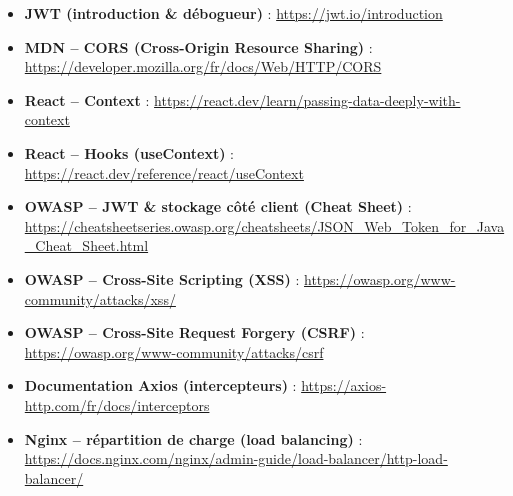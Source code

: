 \begin{itemize}
	\item \textbf{JWT (introduction \& débogueur)} : \url{https://jwt.io/introduction}
	\item \textbf{MDN -- CORS (Cross-Origin Resource Sharing)} : \url{https://developer.mozilla.org/fr/docs/Web/HTTP/CORS}
	\item \textbf{React -- Context} : \url{https://react.dev/learn/passing-data-deeply-with-context}
	\item \textbf{React -- Hooks (useContext)} : \url{https://react.dev/reference/react/useContext}
	\item \textbf{OWASP -- JWT \& stockage côté client (Cheat Sheet)} : \url{https://cheatsheetseries.owasp.org/cheatsheets/JSON_Web_Token_for_Java_Cheat_Sheet.html}
	\item \textbf{OWASP -- Cross-Site Scripting (XSS)} : \url{https://owasp.org/www-community/attacks/xss/}
	\item \textbf{OWASP -- Cross-Site Request Forgery (CSRF)} : \url{https://owasp.org/www-community/attacks/csrf}
	\item \textbf{Documentation Axios (intercepteurs)} : \url{https://axios-http.com/fr/docs/interceptors}
	\item \textbf{Nginx -- répartition de charge (load balancing)} : \url{https://docs.nginx.com/nginx/admin-guide/load-balancer/http-load-balancer/}
\end{itemize}
